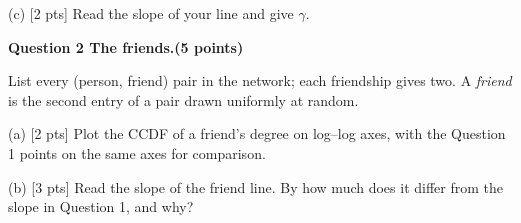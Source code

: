 \documentclass[a4paper, 11pt]{extarticle}
\renewcommand{\question}[3]{%
  \vspace{0.4em}
  {\large\bfseries Question #1 \quad #3\quad\normalsize\mdseries (#2 points)}\par
  \vspace{-0.4em}{\color{rulegrey}\rule{\textwidth}{0.6pt}}\par}
\begin{document}
(c) [2 pts] Read the slope of your line and give $\gamma$.

\question{2}{5}{The friends.}

List every (person, friend) pair in the network; each friendship gives two.
A \emph{friend} is the second entry of a pair drawn uniformly at random.

(a) [2 pts] Plot the CCDF of a friend's degree on log--log axes, with the
Question 1 points on the same axes for comparison.

(b) [3 pts] Read the slope of the friend line. By how much does it differ
from the slope in Question 1, and why?

\vfill
\end{document}
